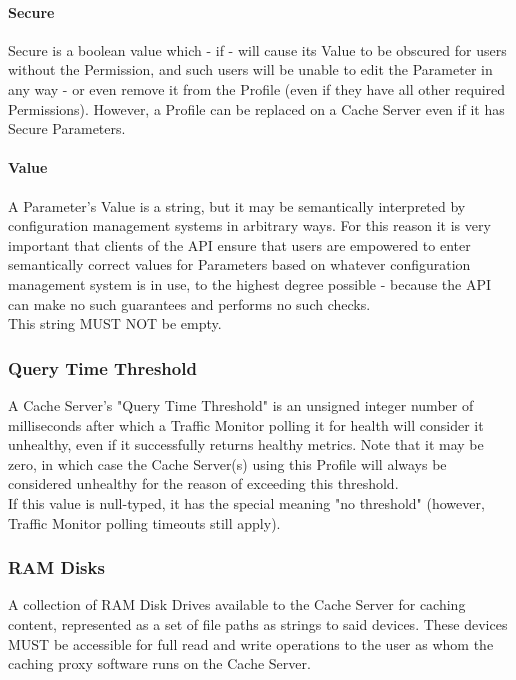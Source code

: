 \paragraph{Secure\label{sec:profile:param:secure}}
Secure is a boolean value which - if  - will cause its Value to be
obscured for users without the  Permission, and such
users will be unable to edit the Parameter in any way - or even remove it from
the Profile (even if they have all other required Permissions). However, a
Profile can be replaced on a Cache Server even if it has Secure Parameters.

\paragraph{Value}
A Parameter's Value is a string, but it may be semantically interpreted by
configuration management systems in arbitrary ways. For this reason it is very
important that clients of the API ensure that users are empowered to enter
semantically correct values for Parameters based on whatever configuration
management system is in use, to the highest degree possible - because the API
can make no such guarantees and performs no such checks.\\
This string MUST NOT be empty.

\subsubsection{Query Time Threshold}
A Cache Server's "Query Time Threshold" is an unsigned integer number of
milliseconds after which a Traffic Monitor polling it for health will consider
it unhealthy, even if it successfully returns healthy metrics. Note that it may
be zero, in which case the Cache Server(s) using this Profile will always be
considered unhealthy for the reason of exceeding this threshold.\\
If this value is null-typed, it has the special meaning "no threshold"
(however, Traffic Monitor polling timeouts still apply).

\subsubsection{RAM Disks}
A collection of RAM Disk Drives available to the Cache Server for caching
content, represented as a set of file paths as strings to said devices. These
devices MUST be accessible for full read and write operations to the user as
whom the caching proxy software runs on the Cache Server.

